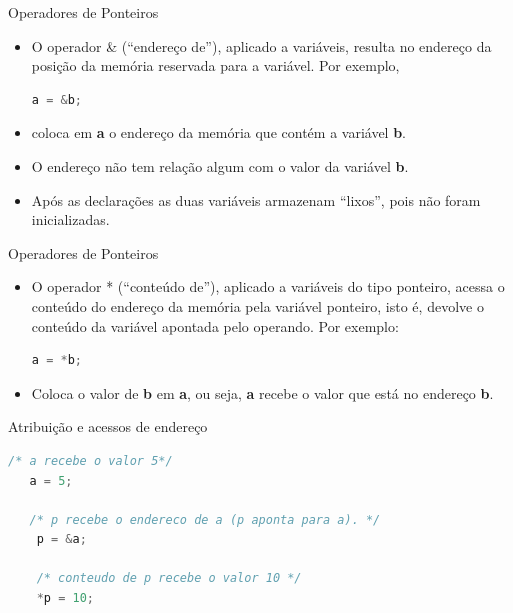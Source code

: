 \begin{frame}[fragile,c]{Operadores de Ponteiros}
  \begin{itemize}[<+->]
     \item O operador \& (``endereço de''), aplicado a variáveis, resulta no \alert{endereço da posição da memória} reservada para a variável. Por exemplo,
     \begin{lstlisting}[language=C]
       a = &b;     
     \end{lstlisting}
      \item coloca em \textbf{a} o endereço da memória que contém a variável \textbf{b}.
    \item O endereço não tem relação algum com o valor da variável \textbf{b}.    
      \item Após as declarações as duas variáveis armazenam  ``lixos'', pois não foram inicializadas.
 \end{itemize}  
\end{frame}

\begin{frame}[fragile,c]{Operadores de Ponteiros}
  \begin{itemize}[<+->]
    \item O operador * (``conteúdo de''), aplicado a variáveis do \alert{tipo ponteiro}, acessa o \alert{conteúdo do endereço da memória} pela variável ponteiro, isto é, devolve o conteúdo da variável apontada pelo operando. Por exemplo:
    \begin{lstlisting}[language=C]
       a = *b;
    \end{lstlisting}
    \item Coloca o valor de \textbf{b} em \textbf{a}, ou seja, \textbf{a} recebe o valor que está no endereço \textbf{b}.
  \end{itemize}
\end{frame}

\begin{frame}[fragile,c]{Atribuição e acessos de endereço}
 \begin{lstlisting}[language=C]
   /* a recebe o valor 5*/
   a = 5;
   
   /* p recebe o endereco de a (p aponta para a). */
    p = &a;
    
    /* conteudo de p recebe o valor 10 */
    *p = 10;
 \end{lstlisting}
\end{frame}

